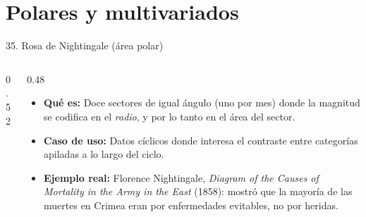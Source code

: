 \documentclass[aspectratio=169,9pt]{beamer}
\newcommand{\ficha}[3]{%
\begin{itemize}
\item \textbf{Qué es:} #1
\item \textbf{Caso de uso:} #2
\item \textbf{Ejemplo real:} #3
\end{itemize}}
\begin{document}
\section{Polares y multivariados}

\begin{frame}{35. Rosa de Nightingale (área polar)}
\begin{columns}[T]
\begin{column}{0.52\textwidth}
\centering
{}
\end{column}
\begin{column}{0.48\textwidth}
\ficha{Doce sectores de igual ángulo (uno por mes) donde la magnitud se codifica en el \emph{radio}, y por lo tanto en el área del sector.}
{Datos cíclicos donde interesa el contraste entre categorías apiladas a lo largo del ciclo.}
{Florence Nightingale, \emph{Diagram of the Causes of Mortality in the Army in the East} (1858): mostró que la mayoría de las muertes en Crimea eran por enfermedades evitables, no por heridas.}
\end{column}
\end{columns}
\end{frame}
\end{document}
